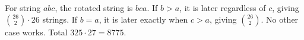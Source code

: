 For string $abc$, the rotated string is $bca$. If $b>a$, it is later regardless of $c$, giving $\binom{26}2\cdot26$ strings. If $b=a$, it is later exactly when $c>a$, giving $\binom{26}2$. No other case works. Total $325\cdot27=\boxed{8775}$.
